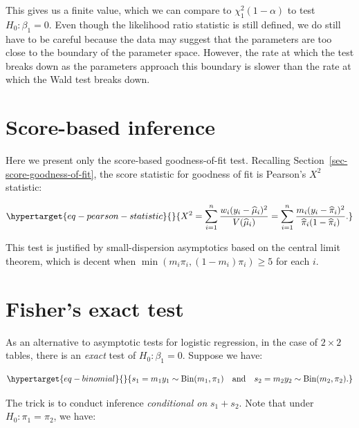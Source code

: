 \documentclass[
  11pt,
  letterpaper,
  oneside]{book}
\theoremstyle{plain}
\theoremstyle{definition}
\theoremstyle{definition}
\theoremstyle{plain}
\theoremstyle{plain}
\theoremstyle{remark}
\begin{document}
This gives us a finite value, which we can compare to
\(\chi^2_{1}(1-\alpha)\) to test \(H_0: \beta_1 = 0\). Even though the
likelihood ratio statistic is still defined, we do still have to be
careful because the data may suggest that the parameters are too close
to the boundary of the parameter space. However, the rate at which the
test breaks down as the parameters approach this boundary is slower than
the rate at which the Wald test breaks down.

\hypertarget{sec-score-based-inference}{%
\section{Score-based inference}\label{sec-score-based-inference}}

Here we present only the score-based goodness-of-fit test. Recalling
Section~\ref{sec-score-goodness-of-fit}, the score statistic for
goodness of fit is Pearson's \(X^2\) statistic:

\begin{equation}\protect\hypertarget{eq-pearson-statistic}{}{
X^2 = \sum_{i = 1}^n \frac{w_i (y_i - \widehat \mu_i)^2}{V(\widehat \mu_i)} = \sum_{i = 1}^n \frac{m_i(y_i - \widehat \pi_i)^2}{\widehat \pi_i(1-\widehat \pi_i)}.
}\label{eq-pearson-statistic}\end{equation}

This test is justified by small-dispersion asymptotics based on the
central limit theorem, which is decent when
\(\min(m_i \pi_i, (1-m_i)\pi_i) \geq 5\) for each \(i\).

\hypertarget{sec-fisher-exact-test}{%
\section{Fisher's exact test}\label{sec-fisher-exact-test}}

As an alternative to asymptotic tests for logistic regression, in the
case of \(2 \times 2\) tables, there is an \emph{exact} test of
\(H_0: \beta_1 = 0\). Suppose we have:

\begin{equation}\protect\hypertarget{eq-binomial}{}{
s_1 = m_1y_1 \sim \text{Bin}(m_1, \pi_1) \quad \text{and} \quad s_2 = m_2y_2 \sim \text{Bin}(m_2, \pi_2).
}\label{eq-binomial}\end{equation}

The trick is to conduct inference \emph{conditional on} \(s_1 + s_2\).
Note that under \(H_0: \pi_1 = \pi_2\), we have:
\end{document}
